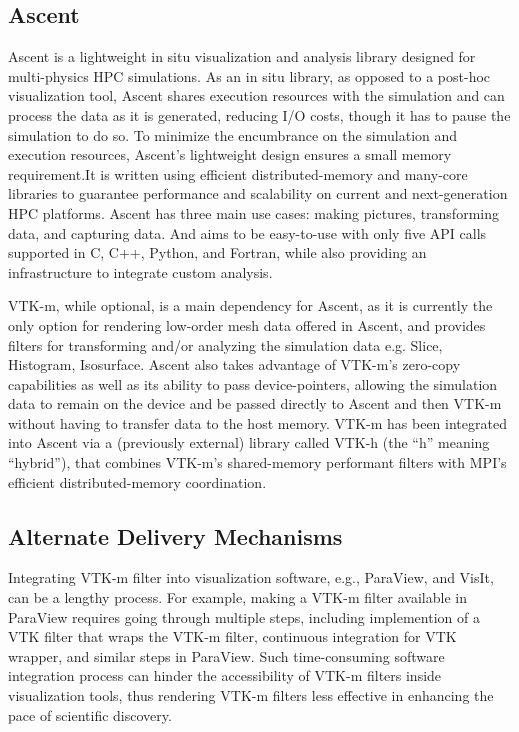 \subsection{Ascent}
Ascent is a lightweight in situ visualization and analysis library designed for multi-physics HPC simulations. As an in situ library, as opposed to a post-hoc visualization tool, Ascent shares execution resources with the simulation and can process the data as it is generated, reducing I/O costs, though it has to pause the simulation to do so. To minimize the encumbrance on the simulation and execution resources, Ascent’s lightweight design ensures a small memory requirement.It is written using efficient distributed-memory and many-core libraries to guarantee performance and scalability on current and next-generation HPC platforms. 
Ascent has three main use cases: making pictures, transforming data, and capturing data. And aims to be easy-to-use with only five API calls supported in C, C++, Python, and Fortran, while also providing an infrastructure to integrate custom analysis.

VTK-m, while optional, is a main dependency for Ascent, as it is currently the only option for rendering low-order mesh data offered in Ascent, and provides filters for transforming and/or analyzing the simulation data e.g. Slice, Histogram, Isosurface. Ascent also takes advantage of VTK-m’s zero-copy capabilities as well as its ability to pass device-pointers, allowing the simulation data to remain on the device and be passed directly to Ascent and then VTK-m without having to transfer data to the host memory. VTK-m has been integrated into Ascent via a (previously external) library called VTK-h (the “h” meaning “hybrid”), that combines VTK-m’s shared-memory performant filters with MPI’s efficient distributed-memory coordination.


\subsection{Alternate Delivery Mechanisms}

Integrating VTK-m filter into visualization software, e.g., ParaView, and VisIt, can be a lengthy process. For example, making a VTK-m filter available in ParaView requires going through multiple steps, including implemention of a VTK filter that wraps the VTK-m filter, continuous integration for VTK wrapper, and similar steps in ParaView. Such time-consuming software integration process can hinder the accessibility of VTK-m filters inside visualization tools, thus rendering VTK-m filters less effective in enhancing the pace of scientific discovery. 

